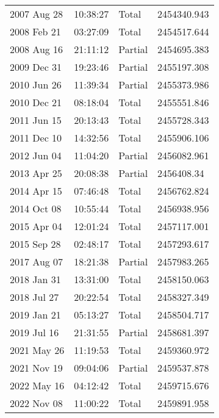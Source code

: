 \documentclass[a4paper,fontset=fandol]{ctexart}
\begin{document}
{\begin{longtable}{|l|l|l|l|}
			2007 Aug 28 & 10:38:27 & Total & 2454340.943 \\
			2008 Feb 21 & 03:27:09 & Total & 2454517.644 \\
			\hline
			2008 Aug 16 & 21:11:12 & Partial & 2454695.383 \\
			2009 Dec 31 & 19:23:46 & Partial & 2455197.308 \\
			2010 Jun 26 & 11:39:34 & Partial & 2455373.986 \\
			2010 Dec 21 & 08:18:04 & Total & 2455551.846 \\
			2011 Jun 15 & 20:13:43 & Total & 2455728.343 \\
			\hline
			2011 Dec 10 & 14:32:56 & Total & 2455906.106 \\
			2012 Jun 04 & 11:04:20 & Partial & 2456082.961 \\
			2013 Apr 25 & 20:08:38 & Partial & 2456408.34 \\
			2014 Apr 15 & 07:46:48 & Total & 2456762.824 \\
			2014 Oct 08 & 10:55:44 & Total & 2456938.956 \\
			\hline
			2015 Apr 04 & 12:01:24 & Total & 2457117.001 \\
			2015 Sep 28 & 02:48:17 & Total & 2457293.617 \\
			2017 Aug 07 & 18:21:38 & Partial & 2457983.265 \\
			2018 Jan 31 & 13:31:00 & Total & 2458150.063 \\
			2018 Jul 27 & 20:22:54 & Total & 2458327.349 \\
			\hline
			2019 Jan 21 & 05:13:27 & Total & 2458504.717 \\
			2019 Jul 16 & 21:31:55 & Partial & 2458681.397 \\
			2021 May 26 & 11:19:53 & Total & 2459360.972 \\
			2021 Nov 19 & 09:04:06 & Partial & 2459537.878 \\
			2022 May 16 & 04:12:42 & Total & 2459715.676 \\
			2022 Nov 08 & 11:00:22 & Total & 2459891.958 \\
			\hline
		\end{longtable}
}
	
\end{document}
